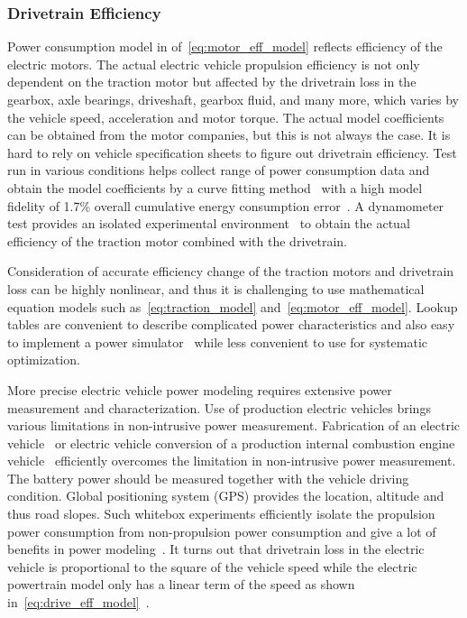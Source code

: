 \subsubsection{Drivetrain Efficiency} \label{subsubsec:drive_eff}

Power consumption model in of~\eqref{eq:motor_eff_model} reflects efficiency of the electric motors. The actual electric vehicle propulsion efficiency is not only dependent on the traction motor but affected by the drivetrain loss in the gearbox, axle bearings, driveshaft, gearbox fluid, and many more, which varies by the vehicle speed, acceleration and motor torque. The actual model coefficients can be obtained from the motor companies, but this is not always the case.
It is hard to rely on vehicle specification sheets to figure out drivetrain efficiency. Test run in various conditions helps collect range of power consumption data and obtain the model coefficients by a curve fitting method~\cite{Dib:OGST12} with a high model fidelity of 1.7\% overall cumulative energy consumption error~\cite{Dib:OGST12}. A dynamometer test provides an isolated experimental environment~\cite{Schwickart:JFI15} to obtain the actual efficiency of the traction motor combined with the drivetrain.

Consideration of accurate efficiency change of the traction motors and drivetrain loss can be highly nonlinear, and thus it is challenging to use mathematical equation models such as~\eqref{eq:traction_model} and~\eqref{eq:motor_eff_model}. Lookup tables are convenient to describe complicated power characteristics and also easy to implement a power simulator~\cite{Schwickart:JFI15} while less convenient to use for systematic optimization.

More precise electric vehicle power modeling requires extensive power measurement and characterization. Use of production electric vehicles brings various limitations in non-intrusive power measurement. Fabrication of an electric vehicle~\cite{Hong:ASPDAC16} or electric vehicle conversion of a production internal combustion engine vehicle~\cite{Wu:TR15} efficiently overcomes the limitation in non-intrusive power measurement. The battery power should be measured together with the vehicle driving condition. Global positioning system (GPS) provides the location, altitude and thus road slopes. Such whitebox experiments efficiently isolate the propulsion power consumption from non-propulsion power consumption and give a lot of benefits in power modeling~\cite{Hong:ASPDAC16,Wu:TR15}. It turns out that drivetrain loss in the electric vehicle is proportional to the square of the vehicle speed while the electric powertrain model only has a linear term of the speed as shown in~\eqref{eq:drive_eff_model}~\cite{Hong:ASPDAC16}.


